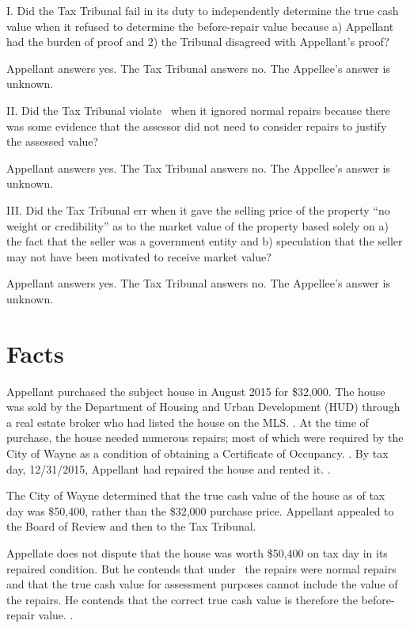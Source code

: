 \documentclass[12pt,\documentclassflag]{michiganCourtOfAppealsBrief}
\begin{document}
\noindent I. Did the Tax Tribunal fail in its duty to independently determine the true cash value when it refused to determine the before-repair value because a) Appellant had the burden of proof and 2) the Tribunal disagreed with Appellant's proof?

Appellant answers yes. The Tax Tribunal answers no. The Appellee's answer is unknown. 
\vspace{\baselineskip}

\noindent II. Did the Tax Tribunal violate \mathieuGast\ when it ignored normal repairs because there was some evidence that the assessor did not need to consider repairs to justify the assessed value?

Appellant answers yes. The Tax Tribunal answers no. The Appellee's answer is unknown.

\vspace{\baselineskip}

\noindent III. Did the Tax Tribunal err when it gave the selling price of the property ``no weight or credibility'' as to the market value of the property based solely on a) the fact that the seller was a government entity and b) speculation that the seller may not have been motivated to receive market value?

Appellant answers yes. The Tax Tribunal answers no. The Appellee's answer is unknown. 
 
\newpage

\section{Facts}
\label{facts}
Appellant purchased the subject house in August 2015 for \$32,000. The house was sold by the Department of Housing and Urban Development (HUD) through a real estate broker who had listed the house on the MLS. \mlsListing[]. At the time of purchase, the house needed numerous repairs; most of which were required by the City of Wayne as a condition of obtaining a Certificate of Occupancy. \repairs[]. By tax day, 12/31/2015, Appellant had repaired the house and rented it. \See \foj[4-5].

The City of Wayne determined that the true cash value of the house as of tax day was \$50,400, rather than the \$32,000 purchase price. Appellant appealed to the Board of Review and then to the Tax Tribunal.

Appellate does not dispute that the house was worth \$50,400 on tax day in its repaired condition. But he contends that under \mathieuGast\ the repairs were normal repairs and that the true cash value for assessment purposes cannot include the value of the repairs. He contends that the correct true cash value is therefore the before-repair value. \explanatoryLetter[].
\end{document}
